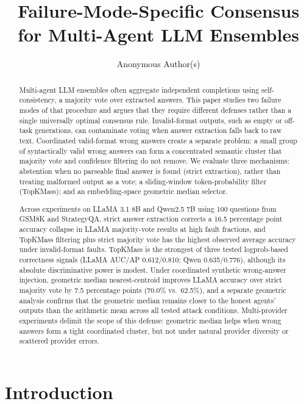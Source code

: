 \documentclass[11pt]{article}
\title{\textbf{Failure-Mode-Specific Consensus\\
       for Multi-Agent LLM Ensembles}}
\author{Anonymous Author(s)}
\date{}
\begin{document}
\maketitle

\begin{abstract}
Multi-agent LLM ensembles often aggregate independent completions using
self-consistency, a majority vote over extracted answers. This paper studies
two failure modes of that procedure and argues that they require different
defenses rather than a single universally optimal consensus rule. Invalid-format
outputs, such as empty or off-task generations, can contaminate voting when
answer extraction falls back to raw text. Coordinated valid-format wrong answers
create a separate problem: a small group of syntactically valid wrong answers can
form a concentrated semantic cluster that majority vote and confidence filtering
do not remove. We evaluate three mechanisms: abstention when no parseable final
answer is found (strict extraction), rather than treating malformed output as a
vote; a sliding-window token-probability filter (TopKMass); and an
embedding-space geometric median selector.

Across experiments on LLaMA 3.1 8B and Qwen2.5 7B using 100 questions from
GSM8K and StrategyQA, strict answer extraction corrects a 16.5 percentage point
accuracy collapse in LLaMA majority-vote results at high fault fractions, and
TopKMass filtering plus strict majority vote has the highest observed average
accuracy under invalid-format faults. TopKMass is the strongest of three tested
logprob-based correctness signals (LLaMA AUC/AP 0.612/0.810; Qwen 0.635/0.776),
although its absolute discriminative power is modest. Under coordinated synthetic
wrong-answer injection, geometric median nearest-centroid improves LLaMA
accuracy over strict majority vote by 7.5 percentage points (70.0\% vs.\ 62.5\%),
and a separate geometric analysis confirms that the geometric median remains
closer to the honest agents' outputs than the arithmetic mean across all tested
attack conditions. Multi-provider experiments delimit the scope of this defense:
geometric median helps when wrong answers form a tight coordinated cluster, but
not under natural provider diversity or scattered provider errors.
\end{abstract}

\section{Introduction}
\label{sec:intro}
\end{document}
